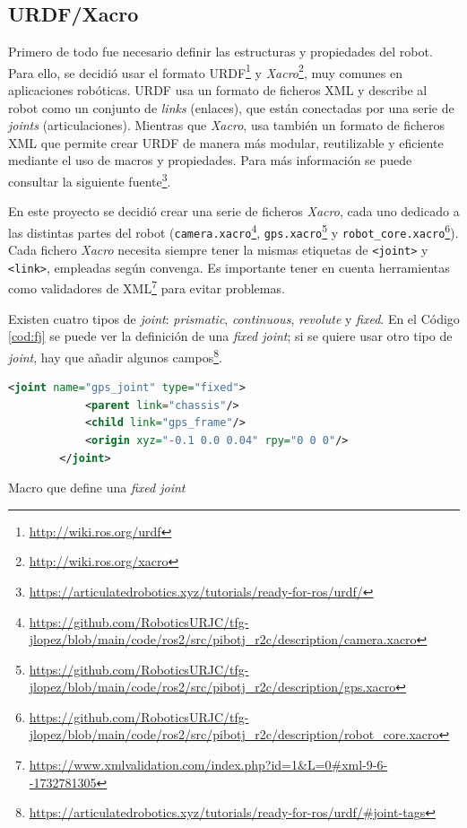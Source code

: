 \subsection{URDF/Xacro}
\label{subsec:urdf}

Primero de todo fue necesario definir las estructuras y propiedades del robot. Para ello, se decidió usar el formato \ac{URDF}\footnote{\url{http://wiki.ros.org/urdf}} y \textit{Xacro}\footnote{\url{http://wiki.ros.org/xacro}}, muy comunes en aplicaciones robóticas. \acs{URDF} usa un formato de ficheros XML y describe al robot como un conjunto de \textit{links} (enlaces), que están conectadas por una serie de \textit{joints} (articulaciones). Mientras que \textit{Xacro}, usa también un formato de ficheros XML que permite crear URDF de manera más modular, reutilizable y eficiente mediante el uso de macros y propiedades. Para más información se puede consultar la siguiente fuente\footnote{\url{https://articulatedrobotics.xyz/tutorials/ready-for-ros/urdf/}}.

En este proyecto se decidió crear una serie de ficheros \textit{Xacro}, cada uno dedicado a las distintas partes del robot (\verb|camera.xacro|\footnote{\url{https://github.com/RoboticsURJC/tfg-jlopez/blob/main/code/ros2/src/pibotj_r2c/description/camera.xacro}}, \verb|gps.xacro|\footnote{\url{https://github.com/RoboticsURJC/tfg-jlopez/blob/main/code/ros2/src/pibotj_r2c/description/gps.xacro}} y \verb|robot_core.xacro|\footnote{\url{https://github.com/RoboticsURJC/tfg-jlopez/blob/main/code/ros2/src/pibotj_r2c/description/robot_core.xacro}}). Cada fichero \textit{Xacro} necesita siempre tener la mismas etiquetas de \verb|<joint>| y \verb|<link>|, empleadas según convenga. Es importante tener en cuenta herramientas como validadores de XML\footnote{\url{https://www.xmlvalidation.com/index.php?id=1&L=0\#xml-9-6--1732781305}} para evitar problemas.

Existen cuatro tipos de \textit{joint}: \textit{prismatic}, \textit{continuous}, \textit{revolute} y \textit{fixed}. En el Código \ref{cod:fj} se puede ver la definición de una \textit{fixed joint}; si se quiere usar otro tipo de \textit{joint}, hay que añadir algunos campos\footnote{\url{https://articulatedrobotics.xyz/tutorials/ready-for-ros/urdf/\#joint-tags}}.

\begin{code}[h]
	\begin{lstlisting}[language=xml]
		<joint name="gps_joint" type="fixed">
			<parent link="chassis"/>
			<child link="gps_frame"/>
			<origin xyz="-0.1 0.0 0.04" rpy="0 0 0"/>
		</joint>
	\end{lstlisting}
	\caption[Macro que define \textit{fixed joint}]{Macro que define una \textit{fixed joint}}
	\label{cod:fj}
			\end{code}

